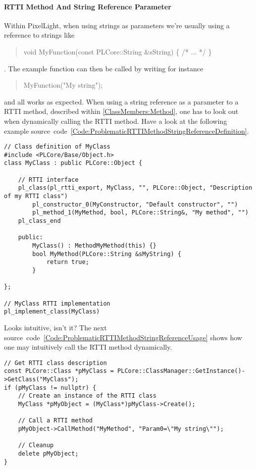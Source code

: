 \paragraph{RTTI Method And String Reference Parameter}
\label{Appendix:CommonPitfalls:RTTIMethodStringReferenceParameter}
Within PixelLight, when using strings as parameters we're usually using a reference to strings like \begin{quote}void MyFunction(const PLCore::String \&sString) \{ /* ... */ \}\end{quote}. The example function can then be called by writing for instance \begin{quote}MyFunction("My string");\end{quote} and all works as expected. When using a string reference as a parameter to a RTTI method, described within \ref{ClassMembers:Method}, one has to look out when dynamically calling the RTTI method. Have a look at the following example source~code~\ref{Code:ProblematicRTTIMethodStringReferenceDefinition}.
\begin{lstlisting}[label=Code:ProblematicRTTIMethodStringReferenceDefinition,caption={Problematic RTTI method and string reference parameter definition}]
// Class definition of MyClass
#include <PLCore/Base/Object.h>
class MyClass : public PLCore::Object {

	// RTTI interface
	pl_class(pl_rtti_export, MyClass, "", PLCore::Object, "Description of my RTTI class")
		pl_constructor_0(MyConstructor, "Default constructor", "")
		pl_method_1(MyMethod, bool, PLCore::String&, "My method", "")
	pl_class_end

	public:
		MyClass() : MethodMyMethod(this) {}
		bool MyMethod(PLCore::String &sMyString) {
			return true;
		}

};

// MyClass RTTI implementation
pl_implement_class(MyClass)
\end{lstlisting}
Looks intuitive, isn't it? The next source~code~\ref{Code:ProblematicRTTIMethodStringReferenceUsage} shows how one may intuitively call the RTTI method dynamically.
\begin{lstlisting}[label=Code:ProblematicRTTIMethodStringReferenceUsage,caption={Problematic RTTI method and string reference parameter usage}]
// Get RTTI class description
const PLCore::Class *pMyClass = PLCore::ClassManager::GetInstance()->GetClass("MyClass");
if (pMyClass != nullptr) {
	// Create an instance of the RTTI class
	MyClass *pMyObject = (MyClass*)pMyClass->Create();

	// Call a RTTI method
	pMyObject->CallMethod("MyMethod", "Param0=\"My string\"");

	// Cleanup
	delete pMyObject;
}
\end{lstlisting}
